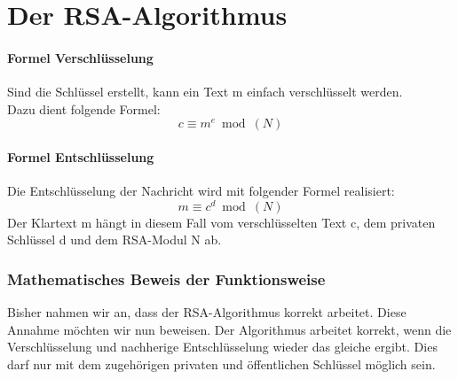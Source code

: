 \part{Der RSA-Algorithmus}
%

%

%
\subsection{Formel Verschlüsselung}
Sind die Schlüssel erstellt, kann ein Text m einfach verschlüsselt werden.\\
Dazu dient folgende Formel:
%
\begin{equation}
  c \equiv m^e  \bmod(N)
  \label{eqn:rsa_encription}
\end{equation}
%

\subsection{Formel Entschlüsselung}
Die Entschlüsselung der Nachricht wird mit folgender Formel realisiert:
%
\begin{equation}
  m \equiv c^d \bmod(N)
  \label{eqn:rsa_decription}
\end{equation}
%
Der Klartext m hängt in diesem Fall vom verschlüsselten Text c, dem privaten Schlüssel d und dem RSA-Modul N ab. 
%
%
\newpage
\section{Mathematisches Beweis der Funktionsweise}
Bisher nahmen wir an, dass der RSA-Algorithmus korrekt arbeitet. Diese Annahme möchten wir nun beweisen. Der Algorithmus arbeitet korrekt, wenn die Verschlüsselung und nachherige Entschlüsselung wieder das gleiche ergibt. Dies darf nur mit dem zugehörigen privaten und öffentlichen Schlüssel möglich sein.

